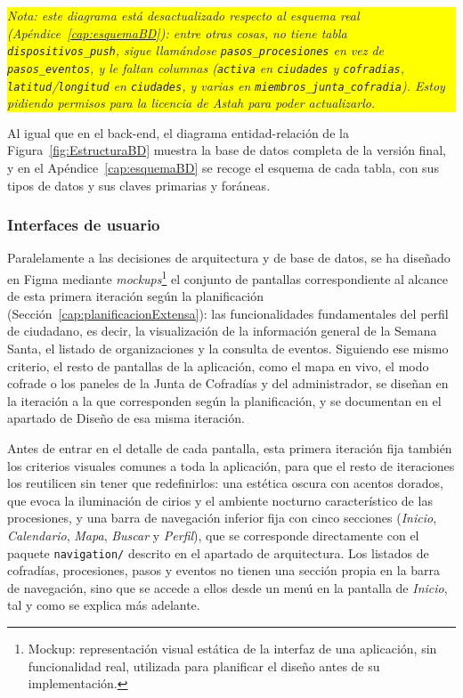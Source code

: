 \colorbox{yellow}{\parbox{\dimexpr\linewidth-2\fboxsep}{\textit{Nota: este diagrama está desactualizado respecto al esquema real (Apéndice~\ref{cap:esquemaBD}): entre otras cosas, no tiene tabla \texttt{dispositivos\_push}, sigue llamándose \texttt{pasos\_procesiones} en vez de \texttt{pasos\_eventos}, y le faltan columnas (\texttt{activa} en \texttt{ciudades} y \texttt{cofradias}, \texttt{latitud}/\texttt{longitud} en \texttt{ciudades}, y varias en \texttt{miembros\_junta\_cofradia}). Estoy pidiendo permisos para la licencia de Astah para poder actualizarlo.}}}

Al igual que en el back-end, el diagrama entidad-relación de la Figura~\ref{fig:EstructuraBD} muestra la base de datos completa de la versión final, y en el Apéndice~\ref{cap:esquemaBD} se recoge el esquema de cada tabla, con sus tipos de datos y sus claves primarias y foráneas.

\subsubsection{Interfaces de usuario}
 
Paralelamente a las decisiones de arquitectura y de base de datos, se ha diseñado en Figma \cite{figma} mediante \emph{mockups}\footnote{Mockup: representación visual estática de la interfaz de una aplicación, sin funcionalidad real, utilizada para planificar el diseño antes de su implementación.} el conjunto de pantallas correspondiente al alcance de esta primera iteración según la planificación (Sección~\ref{cap:planificacionExtensa}): las funcionalidades fundamentales del perfil de ciudadano, es decir, la visualización de la información general de la Semana Santa, el listado de organizaciones y la consulta de eventos. Siguiendo ese mismo criterio, el resto de pantallas de la aplicación, como el mapa en vivo, el modo cofrade o los paneles de la Junta de Cofradías y del administrador, se diseñan en la iteración a la que corresponden según la planificación, y se documentan en el apartado de Diseño de esa misma iteración.

Antes de entrar en el detalle de cada pantalla, esta primera iteración fija también los criterios visuales comunes a toda la aplicación, para que el resto de iteraciones los reutilicen sin tener que redefinirlos: una estética oscura con acentos dorados, que evoca la iluminación de cirios y el ambiente nocturno característico de las procesiones, y una barra de navegación inferior fija con cinco secciones (\emph{Inicio}, \emph{Calendario}, \emph{Mapa}, \emph{Buscar} y \emph{Perfil}), que se corresponde directamente con el paquete \texttt{navigation/} descrito en el apartado de arquitectura. Los listados de cofradías, procesiones, pasos y eventos no tienen una sección propia en la barra de navegación, sino que se accede a ellos desde un menú en la pantalla de \emph{Inicio}, tal y como se explica más adelante.
 
